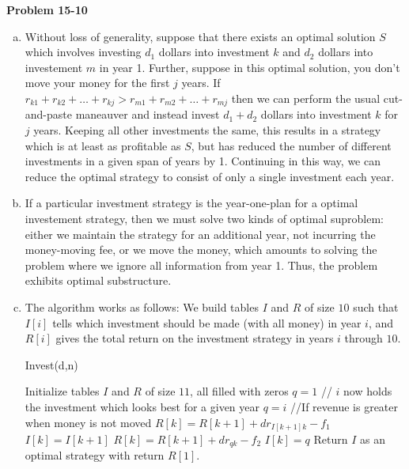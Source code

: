 \documentclass{article}
\begin{document}
\noindent\textbf{Problem 15-10}\\
\begin{enumerate}[a.]
\item Without loss of generality, suppose that there exists an optimal solution $S$ which involves investing $d_1$ dollars into investment $k$ and $d_2$ dollars into investement $m$ in year 1.  Further, suppose in this optimal solution, you don't move your money for the first $j$ years.   If $r_{k1} + r_{k2} + \ldots + r_{kj} > r_{m1} + r_{m2} + \ldots + r_{mj}$ then we can perform the usual cut-and-paste maneauver and instead invest $d_1 + d_2$ dollars into investment $k$ for $j$ years.  Keeping all other investments the same, this results in a strategy which is at least as profitable as $S$, but has reduced the number of different investments in a given span of years by 1.  Continuing in this way, we can reduce the optimal strategy to consist of only a single investment each year.  \\

\item If a particular investment strategy is the year-one-plan for a optimal investement strategy, then we must solve two kinds of optimal suproblem: either we maintain the strategy for an additional year, not incurring the money-moving fee, or we move the money, which amounts to solving the problem where we ignore all information from year 1. Thus, the problem exhibits optimal substructure. \\

\item  The algorithm works as follows: We build tables $I$ and $R$ of size $10$ such that $I[i]$ tells which investment should be made (with all money) in year $i$, and $R[i]$ gives the total return on the investment strategy in years $i$ through $10$.  \\
\begin{algorithm}
\caption{Invest(d,n)}
\begin{algorithmic}
\State Initialize tables $I$ and $R$ of size $11$, all filled with zeros
	\State $q = 1$
		 // $i$ now holds the investment which looks best for a given year
			\State $q = i$
		\EndIf
	\EndFor
	 //If revenue is greater when money is not moved
		\State $R[k] = R[k+1] + dr_{I[k+1]k} - f_1$
		\State $I[k] = I[k+1]$
	\Else
		\State $R[k] = R[k+1] + dr_{qk} - f_2$
		\State $I[k] = q$
	\EndIf
\EndFor
\State Return $I$ as an optimal strategy with return $R[1]$.
\end{algorithmic}
\end{algorithm}



\end{enumerate}
\end{document}
